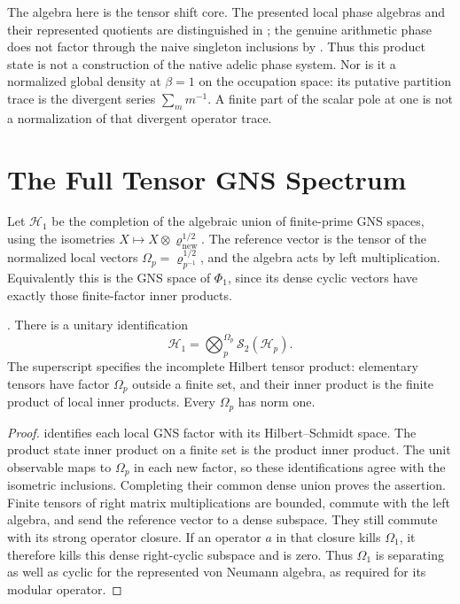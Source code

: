 \begin{remark}
\label{v4-arith:w5-b:rem:wave4-ref}
\label{v4-arith:w5-b:rem:partition-at-one}
The algebra here is the tensor shift core. The presented local
phase algebras and their represented quotients are distinguished
in ; the genuine arithmetic
phase does not factor through the naive singleton inclusions by
. Thus this product
state is not a construction of the native adelic phase system.
Nor is it a normalized global density at $\beta=1$ on the
occupation space: its putative partition trace is the divergent
series $\sum_m m^{-1}$. A finite part of the scalar pole at one
is not a normalization of that divergent operator trace.
\end{remark}

\section{The Full Tensor GNS Spectrum}
\label{v4-arith:w5-b:gns-modular}

\begin{definition}
\label{v4-arith:w5-b:def:gns}
Let $\mathcal H_1$ be the completion of the algebraic union of
finite-prime GNS spaces, using the isometries
$X\mapsto X\otimes\varrho_{\mathrm{new}}^{1/2}$.
The reference vector is the tensor of the normalized local
vectors $\Omega_p=\varrho_{p^{-1}}^{1/2}$, and the algebra acts
by left multiplication. Equivalently this is the GNS space of
$\Phi_1$, since its dense cyclic vectors have exactly those
finite-factor inner products.
\end{definition}

\begin{lemma}
\label{v4-arith:w5-b:lem:gns-restricted-tensor}
\ClaimStatusProvedHere. There is a unitary identification
\[
 \mathcal H_1
   =\bigotimes_{p}^{\Omega_p}\mathcal S_2(\mathscr H_p).
\]
The superscript specifies the incomplete Hilbert tensor product:
elementary tensors have factor $\Omega_p$ outside a finite set,
and their inner product is the finite product of local inner
products. Every $\Omega_p$ has norm one.
\end{lemma}

\begin{proof}
 identifies each local GNS
factor with its Hilbert--Schmidt space. The product state inner
product on a finite set is the product inner product. The unit
observable maps to $\Omega_p$ in each new factor, so these
identifications agree with the isometric inclusions. Completing
their common dense union proves the assertion.
Finite tensors of right matrix multiplications are bounded, commute
with the left algebra, and send the reference vector to a dense
subspace. They still commute with its strong operator closure.
If an operator \(a\) in that closure kills \(\Omega_1\), it therefore
kills this dense right-cyclic subspace and is zero. Thus \(\Omega_1\)
is separating as well as cyclic for the represented von Neumann
algebra, as required for its modular operator.
\end{proof}

